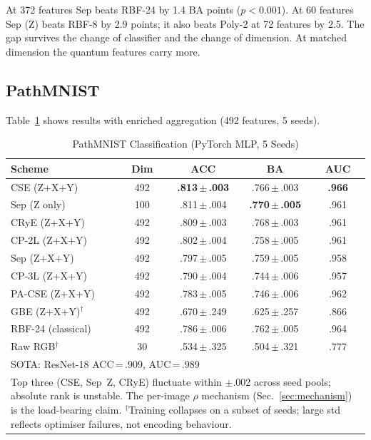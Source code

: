 \documentclass[conference,compsoc]{IEEEtran}
\begin{document}
At 372 features Sep beats RBF-24 by 1.4 BA points ($p < 0.001$). At 60 features Sep (Z) beats RBF-8 by 2.9 points; it also beats Poly-2 at 72 features by 2.5. The gap survives the change of classifier and the change of dimension. At matched dimension the quantum features carry more.

\subsection{PathMNIST}
\label{sec:results_path}

Table~\ref{tab:path} shows results with enriched aggregation (492 features, 5 seeds).

\begin{table}[t]
\renewcommand{\arraystretch}{1.15}
\caption{PathMNIST Classification (PyTorch MLP, 5 Seeds)}
\label{tab:path}
\centering
\begin{tabular}{lcccc}
\toprule
Scheme & Dim & ACC & BA & AUC \\
\midrule
CSE (Z+X+Y) & 492 & \textbf{.813\,$\pm$\,.003} & .766\,$\pm$\,.003 & \textbf{.966} \\
Sep (Z only) & 100 & .811\,$\pm$\,.004 & \textbf{.770\,$\pm$\,.005} & .961 \\
CRyE (Z+X+Y) & 492 & .809\,$\pm$\,.003 & .768\,$\pm$\,.003 & .961 \\
CP-2L (Z+X+Y) & 492 & .802\,$\pm$\,.004 & .758\,$\pm$\,.005 & .961 \\
Sep (Z+X+Y) & 492 & .797\,$\pm$\,.005 & .759\,$\pm$\,.005 & .958 \\
CP-3L (Z+X+Y) & 492 & .790\,$\pm$\,.004 & .744\,$\pm$\,.006 & .957 \\
PA-CSE (Z+X+Y) & 492 & .783\,$\pm$\,.005 & .746\,$\pm$\,.006 & .962 \\
GBE (Z+X+Y)$^\dagger$ & 492 & .670\,$\pm$\,.249 & .625\,$\pm$\,.257 & .866 \\
\midrule
RBF-24 (classical) & 492 & .786\,$\pm$\,.006 & .762\,$\pm$\,.005 & .964 \\
Raw RGB$^\dagger$ & 30 & .534\,$\pm$\,.325 & .504\,$\pm$\,.321 & .777 \\
\midrule
\multicolumn{5}{l}{\footnotesize SOTA: ResNet-18 ACC\,=\,.909, AUC\,=\,.989~\cite{yang2023medmnist}} \\
\multicolumn{5}{p{0.92\columnwidth}}{\footnotesize Top three (CSE, Sep~Z, CRyE) fluctuate within $\pm$.002 across seed pools; absolute rank is unstable. The per-image $\rho$ mechanism (Sec.~\ref{sec:mechanism}) is the load-bearing claim. $^\dagger$Training collapses on a subset of seeds; large std reflects optimiser failures, not encoding behaviour.}
\end{tabular}
\end{table}
\end{document}
